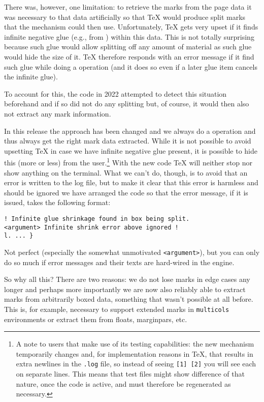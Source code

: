 \documentclass{ltnews}
\makeatletter
\providecommand\env[1]{\texttt{#1}}
\providecommand\env[1]{\texttt{#1}}
\def\verbatim@font{\normalsize\ttfamily}
\makeatother
\begin{document}
There was, however, one limitation: to retrieve the marks from the
page data it was necessary to  that data artificially so
that \TeX{} would produce split marks that the mechanism could then
use. Unfortunately, \TeX{} gets very upset if it finds infinite
negative glue (e.g., from ) within this data. This is not
totally surprising because such glue would allow splitting off any
amount of material as such glue would hide the size of it. \TeX{}
therefore responds with an error message if it find such glue while
doing a  operation (and it does so even if a later glue
item cancels the infinite glue).

To account for this, the code in 2022 attempted to detect this
situation beforehand and if so did not do any splitting but, of
course, it would then also not extract any mark information.

In this release the approach has been changed and we always do a
 operation and thus always get the right mark data
extracted. While it is not possible to avoid upsetting \TeX{} in case
we have infinite negative glue present, it is possible to hide this
(more or less) from the user.\footnote{A note to  users
that make use of its testing capabilities: the new mechanism
temporarily changes  and, for implementation
reasons in \TeX{}, that results in extra newlines in the \texttt{.log}
file, so instead of seeing \texttt{[1] [2]} you will see each on
separate lines. This means that test files might show difference of
that nature, once the code is active, and must therefore be
regenerated as necessary.} With the new code \TeX{} will neither stop
nor show anything on the terminal. What we can't do, though, is to
avoid that an error is written to the log file, but to make it clear
that this error is harmless and should be ignored we have arranged the
code so that the error message, if it is issued, takes the following
format:
\begingroup
\makeatletter
\def\verbatim@font{%
  \small\ttfamily}
\makeatother
\begin{verbatim}
! Infinite glue shrinkage found in box being split.
<argument> Infinite shrink error above ignored !
l. ... }
\end{verbatim}
Not perfect (especially the somewhat unmotivated \texttt{<argument>}),
but you can only do so much if error messages and their texts are
hard-wired in the engine.

\endgroup

So why all this? There are two reasons: we do not lose marks in edge
cases any longer and perhaps more importantly we are now also reliably
able to extract marks from arbitrarily boxed data, something that
wasn't possible at all before. This is, for example, necessary to
support extended marks in \env{multicols} environments or extract them
from floats, marginpars, etc.
\end{document}
